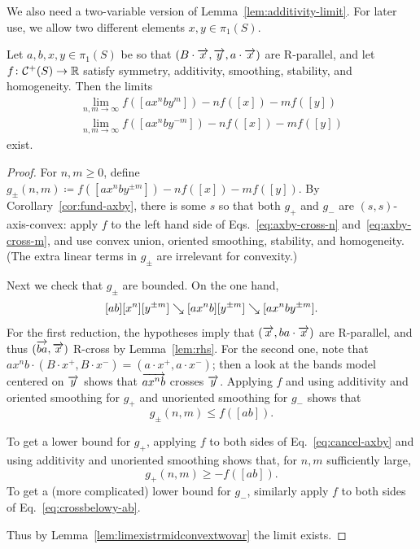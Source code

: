 We also need a two-variable version of
Lemma~\ref{lem:additivity-limit}. For later use, we allow two
different elements $x,y \in \pi_1(S)$.
\begin{lemma}\label{lem:additivity-limit-2}
  Let $a,b,x,y \in \pi_1(S)$ be so that $(B \cdot \overrightarrow{x}, \overrightarrow{y}, a \cdot \overrightarrow{x})$ are R-parallel, and let $f \colon \mathcal{C}^+(S) \to \mathbb{R}$ satisfy symmetry, additivity, smoothing, stability, and homogeneity. Then the limits
  \begin{gather*}
    \lim_{n,m \to \infty} f([ax^nby^m]) - nf([x]) - mf([y])\\
    \lim_{n,m \to \infty} f([ax^nby^{-m}]) - nf([x]) - mf([y])
  \end{gather*}
  exist.
\end{lemma}
\begin{proof}
  For $n,m \ge 0$, define $g_
  {\pm}(n,m) \coloneqq f([ax^nby^{\pm m}]) - nf([x]) - mf([y])$. By Corollary~\ref{cor:fund-axby}, there is some $s$ so that both $g_+$ and $g_-$ are $(s,s)$-axis-convex: apply $f$ to the left hand side of Eqs.~\eqref{eq:axby-cross-n} and~\eqref{eq:axby-cross-m}, and use convex union, oriented smoothing, stability, and homogeneity. (The extra linear terms in $g_{\pm}$ are irrelevant for convexity.)

  Next we check that $g_{\pm}$ are bounded. On the one hand,
  \[
    [ab][x^n][y^{\pm m}] \mathrel{\searrow} [ax^nb][y^{\pm m}] \mathrel{\searrow} [ax^nby^{\pm m}].
  \]
  For the first reduction, the hypotheses imply that
  $(\overrightarrow{x}, ba\cdot\overrightarrow{x})$ are R-parallel, and thus $(\overrightarrow{ba},\overrightarrow{x})$ R-cross by Lemma~\ref{lem:rhs}. For the second one, note that $ax^n b\cdot(B\cdot x^+, B\cdot x^-) = (a\cdot x^+, a\cdot x^-)$; then a look at the bands model centered on $\overrightarrow{y}$ shows that $\overrightarrow{a x^n b}$ crosses $\overrightarrow{y}$.   Applying $f$ and using additivity and oriented smoothing for $g_+$ and unoriented smoothing for $g_-$ shows that
  \[
    g_{\pm}(n,m) \le f([ab]).
  \]

  To get a lower bound for $g_+$, applying $f$ to both sides of Eq.~\eqref{eq:cancel-axby} and using additivity and unoriented smoothing shows that, for $n, m$ sufficiently large,
  \[
    g_+(n,m) \ge -f([ab]).
  \]
 To get a (more complicated) lower bound for $g_-$, similarly apply $f$ to both sides of
 Eq.~\eqref{eq:crossbelowy-ab}.

   Thus by Lemma~\ref{lem:limexistrmidconvextwovar} the limit exists.
\end{proof}


